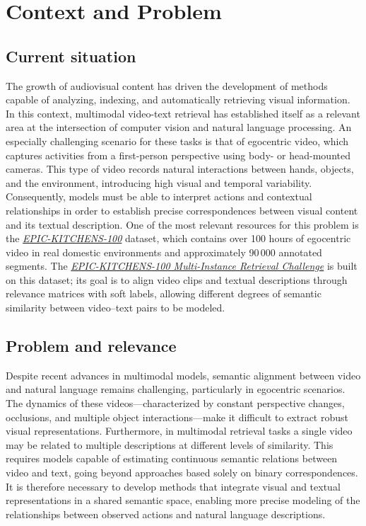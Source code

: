 \section{Context and Problem}

\subsection{Current situation}

The growth of audiovisual content has driven the development of methods capable of analyzing, indexing, and automatically retrieving visual information. In this context, multimodal video-text retrieval has established itself as a relevant area at the intersection of computer vision and natural language processing. An especially challenging scenario for these tasks is that of egocentric video, which captures activities from a first-person perspective using body- or head-mounted cameras. This type of video records natural interactions between hands, objects, and the environment, introducing high visual and temporal variability. Consequently, models must be able to interpret actions and contextual relationships in order to establish precise correspondences between visual content and its textual description. One of the most relevant resources for this problem is the \href{https://epic-kitchens.github.io/}{\textit{EPIC-KITCHENS-100}} dataset, which contains over 100 hours of egocentric video in real domestic environments and approximately 90\,000 annotated segments. The \href{https://www.codabench.org/competitions/12008/#/pages-tab}{\textit{EPIC-KITCHENS-100 Multi-Instance Retrieval Challenge}} is built on this dataset; its goal is to align video clips and textual descriptions through relevance matrices with soft labels, allowing different degrees of semantic similarity between video--text pairs to be modeled.

\subsection{Problem and relevance}

Despite recent advances in multimodal models, semantic alignment between video and natural language remains challenging, particularly in egocentric scenarios. The dynamics of these videos—characterized by constant perspective changes, occlusions, and multiple object interactions—make it difficult to extract robust visual representations. Furthermore, in multimodal retrieval tasks a single video may be related to multiple descriptions at different levels of similarity. This requires models capable of estimating continuous semantic relations between video and text, going beyond approaches based solely on binary correspondences. It is therefore necessary to develop methods that integrate visual and textual representations in a shared semantic space, enabling more precise modeling of the relationships between observed actions and natural language descriptions.

